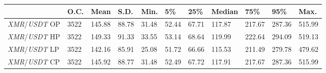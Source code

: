 \begin{tabular}{lllllllllll}
\toprule
 & \textbf{O.C.} & \textbf{Mean} & \textbf{S.D.} & \textbf{Min.} & \textbf{5\%} & \textbf{25\%} & \textbf{Median} & \textbf{75\%} & \textbf{95\%} & \textbf{Max.} \\
\midrule
\emph{XMR}/\emph{USDT} OP & 3522 & 145.88 & 88.78 & 31.48 & 52.44 & 67.71 & 117.87 & 217.67 & 287.36 & 515.99 \\
\emph{XMR}/\emph{USDT} HP & 3522 & 149.33 & 91.33 & 33.55 & 53.14 & 68.64 & 119.99 & 222.64 & 294.09 & 519.13 \\
\emph{XMR}/\emph{USDT} LP & 3522 & 142.16 & 85.91 & 25.08 & 51.72 & 66.66 & 115.53 & 211.49 & 279.78 & 479.62 \\
\emph{XMR}/\emph{USDT} CP & 3522 & 145.92 & 88.77 & 31.48 & 52.49 & 67.72 & 117.91 & 217.67 & 287.36 & 515.99 \\
\bottomrule
\end{tabular}
